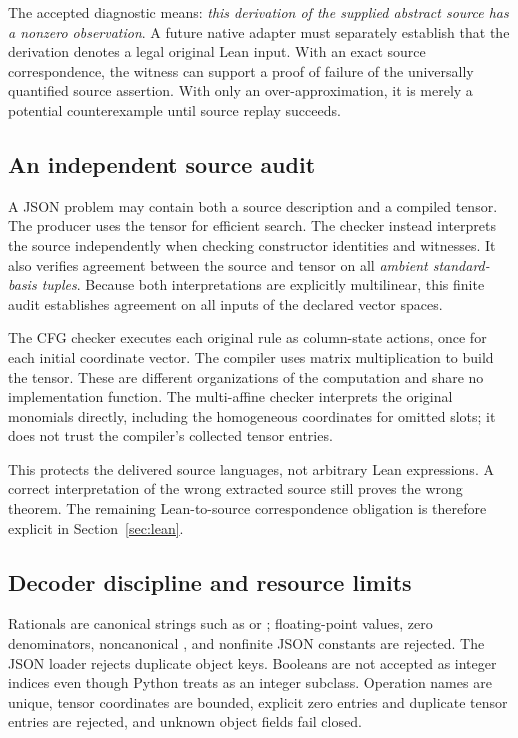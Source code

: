 \documentclass[11pt,letterpaper]{article}
\theoremstyle{definition}\newtheorem{definition}[theorem]{Definition}
\theoremstyle{remark}\newtheorem{remark}[theorem]{Remark}
\newcommand{\code}[1]{\texttt{\detokenize{#1}}}
\begin{document}
The accepted diagnostic means: \emph{this derivation of the supplied abstract source has a nonzero observation}. A future native adapter must separately establish that the derivation denotes a legal original Lean input. With an exact source correspondence, the witness can support a proof of failure of the universally quantified source assertion. With only an over-approximation, it is merely a potential counterexample until source replay succeeds.

\subsection{An independent source audit}
A JSON problem may contain both a source description and a compiled tensor. The producer uses the tensor for efficient search. The checker instead interprets the source independently when checking constructor identities and witnesses. It also verifies agreement between the source and tensor on all \emph{ambient standard-basis tuples}. Because both interpretations are explicitly multilinear, this finite audit establishes agreement on all inputs of the declared vector spaces.

The CFG checker executes each original rule as column-state actions, once for each initial coordinate vector. The compiler uses matrix multiplication to build the tensor. These are different organizations of the computation and share no implementation function. The multi-affine checker interprets the original monomials directly, including the homogeneous coordinates for omitted slots; it does not trust the compiler's collected tensor entries.

This protects the delivered source languages, not arbitrary Lean expressions. A correct interpretation of the wrong extracted source still proves the wrong theorem. The remaining Lean-to-source correspondence obligation is therefore explicit in Section~\ref{sec:lean}.

\subsection{Decoder discipline and resource limits}
Rationals are canonical strings such as \code{"-3/2"} or \code{"0"}; floating-point values, zero denominators, noncanonical \code{"2/2"}, and nonfinite JSON constants are rejected. The JSON loader rejects duplicate object keys. Booleans are not accepted as integer indices even though Python treats \code{bool} as an integer subclass. Operation names are unique, tensor coordinates are bounded, explicit zero entries and duplicate tensor entries are rejected, and unknown object fields fail closed.
\end{document}
